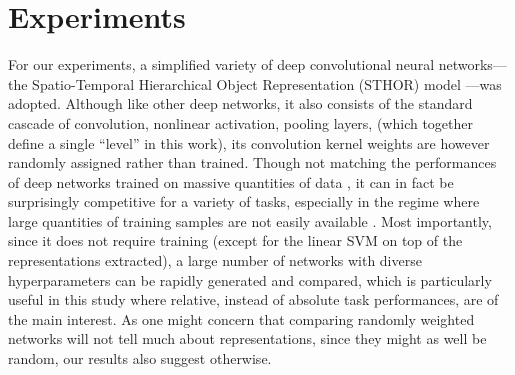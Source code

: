 \documentclass[10pt,twocolumn,letterpaper]{article}
\begin{document}
\section{Experiments}
\label{sec:exp}

For our experiments, a simplified variety of deep convolutional neural networks---the Spatio-Temporal Hierarchical Object Representation (STHOR) model \cite{pinto2009high, sthor}---{was} adopted.
Although like other deep networks, it also consists of the standard cascade of convolution, nonlinear activation, pooling layers, \etc (which together define a single ``level'' in this work), its convolution kernel weights are however randomly assigned rather than trained.
Though not matching the performances of deep networks trained on massive quantities of data \cite{krizhevsky2012imagenet}, it can in fact be surprisingly competitive for a variety of tasks, especially in the regime where large quantities of training samples are not easily available \cite{pinto2009high, cox2011beyond, viglarge}.
Most importantly, since it does not require training (except for the linear SVM on top of the representations extracted), a large number of networks with diverse hyperparameters can be rapidly generated and compared, which is particularly useful in this study where relative, instead of absolute task performances, are of the main interest. 
As one might concern that comparing randomly weighted networks will not tell much about representations, since they might as well be random, our results also suggest otherwise.

\newcommand{\expsettings}{In other words, 32 channels of filters in top levels' convolution layers, a simple setting with reasonable performances.
Following the terminology in recent literatures, shallow and deep neurons corresponded to \texttt{pool1} and \texttt{pool2} layers respectively.
Stimulus dimensionalities of the shallow and deep neurons {were} $N=121$ and $441$ (\ie spatially overlapping $11\times11$ and $21\times21$ receptive fields). %
Other minor changes included: nonlinear activations all simplified to \emph{ReLU} \cite{krizhevsky2012imagenet} mode and normalizations all subtractive mode.
Overall, the architectures were more similar to those in \cite{simonyan2014very}, except pooling operations can be \emph{average}, \emph{squared}, or \emph{max-like} in our case.
}
\end{document}
